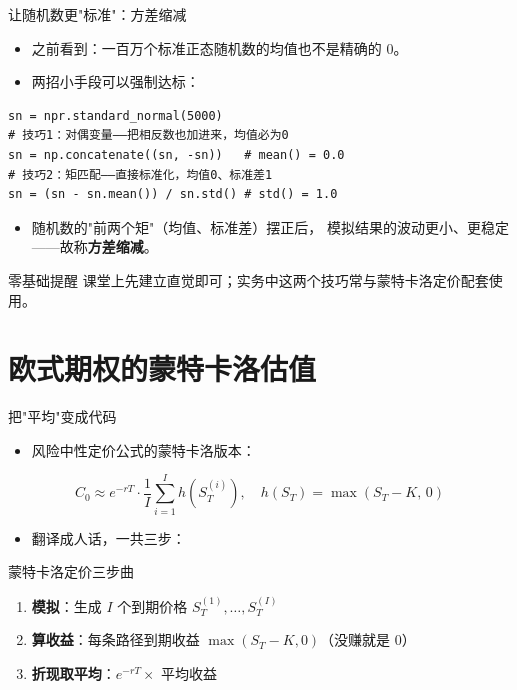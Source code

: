 \documentclass[9pt]{ctexbeamer}
\begin{document}
\begin{frame}[fragile]{让随机数更"标准"：方差缩减}
	\begin{itemize}
		\item 之前看到：一百万个标准正态随机数的均值也不是精确的 0。
		\item 两招小手段可以强制达标：
	\end{itemize}
\begin{lstlisting}
sn = npr.standard_normal(5000)
# 技巧1：对偶变量——把相反数也加进来，均值必为0
sn = np.concatenate((sn, -sn))   # mean() = 0.0
# 技巧2：矩匹配——直接标准化，均值0、标准差1
sn = (sn - sn.mean()) / sn.std() # std() = 1.0
\end{lstlisting}
	\begin{itemize}
		\item 随机数的"前两个矩"（均值、标准差）摆正后，
			模拟结果的波动更小、更稳定——故称\textbf{方差缩减}。
	\end{itemize}
	\begin{alertblock}{零基础提醒}
		课堂上先建立直觉即可；实务中这两个技巧常与蒙特卡洛定价配套使用。
	\end{alertblock}
\end{frame}


\section{欧式期权的蒙特卡洛估值}

\begin{frame}{把"平均"变成代码}
	\begin{itemize}
		\item 风险中性定价公式的蒙特卡洛版本：
	\end{itemize}
	\begin{equation*}
		C_0 \approx e^{-rT}\cdot \frac{1}{I}\sum_{i=1}^{I} h\!\left(S_T^{(i)}\right),
		\quad h(S_T) = \max(S_T - K,\, 0)
	\end{equation*}
	\begin{itemize}
		\item 翻译成人话，一共三步：
	\end{itemize}
	\begin{block}{蒙特卡洛定价三步曲}
		\begin{enumerate}
			\item \textbf{模拟}：生成 $I$ 个到期价格 $S_T^{(1)},\dots,S_T^{(I)}$
			\item \textbf{算收益}：每条路径到期收益 $\max(S_T-K,0)$（没赚就是 0）
			\item \textbf{折现取平均}：$e^{-rT}\times$ 平均收益
		\end{enumerate}
	\end{block}
\end{frame}
\end{document}
